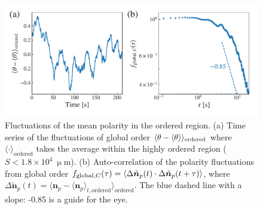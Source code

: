\documentclass[%
 reprint,
 amsmath,amssymb,
 aps,
 floatfix
]{revtex4-2}
\begin{document}
\begin{figure}[tb]
\includegraphics[width=\columnwidth]{global-order.pdf}
\caption{\label{global-order} Fluctuations of the mean polarity in the ordered region. 
(a) Time series of the fluctuations of global order $\langle\theta-\langle\theta\rangle\rangle_{\rm ordered}$ where $\langle\cdot\rangle_{\textrm{ordered}}$ 
takes the average within the highly ordered region ($S<1.8\times10^4~\upmu$m).
(b) Auto-correlation of the polarity fluctuations from global order 
$f_{{\rm global},C}(\tau) = \langle\Delta\tilde{\bm{n}}_p(t)\cdot\Delta\tilde{\bm{n}}_p(t+\tau)\rangle$,
where
$\Delta \tilde{\bm{n}} _{p}(t) = \langle\bm{n}_p - \langle\bm{n}_p\rangle_{t,\textrm{ordered}}\rangle_{\textrm{ordered}}$.
The blue dashed line with a slope: -0.85 is a guide for the eye.
}
\end{figure} 
\end{document}
